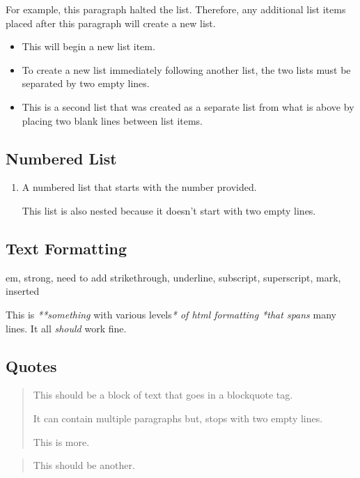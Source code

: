 \documentclass{book}
\begin{document}
\par
For example, this paragraph halted the list. Therefore, any additional list items placed after this paragraph will create a new list.
\begin{itemize}
\item
\par
This will begin a new list item.
\item
\par
To create a new list immediately following another list, the two lists must be separated by two empty lines.
\end{itemize}
\begin{itemize}
\item
\par
This is a second list that was created as a separate list from what is above by placing two blank lines between list items.
\end{itemize}
\subsection{\label{numbered-list}Numbered List}
\begin{enumerate}
\item
\par
A numbered list that starts with the number provided.
\par
This list is also nested because it doesn't start with two empty lines.
\end{enumerate}
\subsection{\label{text-formatting}Text Formatting}
\par
em, strong, need to add strikethrough, underline, subscript, superscript, mark, inserted
\par
This is \emph{**something} with various levels\emph{* of html formatting *that spans} many lines. It all \emph{should} work fine.
\subsection{\label{quotes}Quotes}
\begin{quote}
\par
This should be a block of text that goes in a blockquote tag.
\par
It can contain multiple paragraphs but, stops with two empty lines.
\par
This is more. 
\end{quote}
\begin{quote}
\par
This should be another.
\end{quote}
\end{document}
